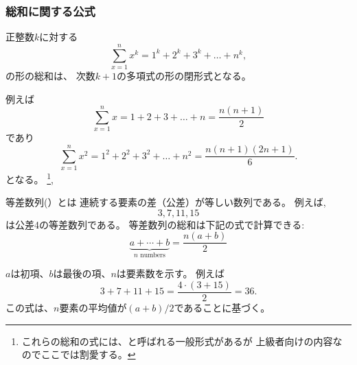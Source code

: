 \subsubsection{総和に関する公式}

正整数$k$に対する \[\sum_{x=1}^n x^k = 1^k+2^k+3^k+\ldots+n^k,\] の形の総和は、
次数$k+1$の多項式の形の閉形式となる。

例えば
\[\sum_{x=1}^n x = 1+2+3+\ldots+n = \frac{n(n+1)}{2}\]
であり
\[\sum_{x=1}^n x^2 = 1^2+2^2+3^2+\ldots+n^2 = \frac{n(n+1)(2n+1)}{6}.\]
となる。
\footnote{
これらの総和の式には、と呼ばれる一般形式があるが
上級者向けの内容なのでここでは割愛する。},

\begin{comment}
An \key{arithmetic progression} is a \index{arithmetic progression}
sequence of numbers
where the difference between any two consecutive
numbers is constant.
For example,
\[3, 7, 11, 15\]
is an arithmetic progression with constant 4.
The sum of an arithmetic progression can be calculated
using the formula
\[\underbrace{a + \cdots + b}_{n \,\, \textrm{numbers}} = \frac{n(a+b)}{2}\]
where $a$ is the first number,
$b$ is the last number and
$n$ is the amount of numbers.
For example,
\[3+7+11+15=\frac{4 \cdot (3+15)}{2} = 36.\]
The formula is based on the fact
that the sum consists of $n$ numbers and
the value of each number is $(a+b)/2$ on average.
\end{comment}

等差数列(）とは
連続する要素の差（公差）が等しい数列である。
例えば,
\[3, 7, 11, 15\]
は公差4の等差数列である。
等差数列の総和は下記の式で計算できる:
\[\underbrace{a + \cdots + b}_{n \,\, \textrm{numbers}} = \frac{n(a+b)}{2}\]

$a$は初項、$b$は最後の項、$n$は要素数を示す。
例えば
\[3+7+11+15=\frac{4 \cdot (3+15)}{2} = 36.\]
この式は、$n$要素の平均値が$(a+b)/2$であることに基づく。

\begin{comment}
\index{geometric progression}
A \key{geometric progression} is a sequence
of numbers
where the ratio between any two consecutive
numbers is constant.
For example,
\[3,6,12,24\]
is a geometric progression with constant 2.
The sum of a geometric progression can be calculated
using the formula
\[a + ak + ak^2 + \cdots + b = \frac{bk-a}{k-1}\]
where $a$ is the first number,
$b$ is the last number and the
ratio between consecutive numbers is $k$.
For example,
\[3+6+12+24=\frac{24 \cdot 2 - 3}{2-1} = 45.\]
\end{comment}

